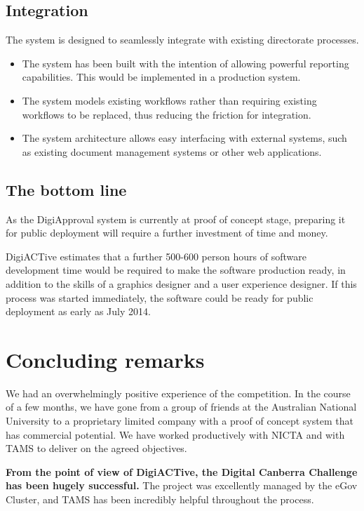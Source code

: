 \documentclass[12pt,a4paper,twosided]{article}
\begin{document}
\subsection{Integration}

The system is designed to seamlessly integrate with existing directorate
processes.

\begin{itemize}

\item
  The system has been built with the intention of allowing powerful
  reporting capabilities. This would be implemented in a production
  system.
\item
  The system models existing workflows rather than requiring existing
  workflows to be replaced, thus reducing the friction for integration.
\item
  The system architecture allows easy interfacing with external systems, such as existing document management systems or other web applications.
\end{itemize}

\subsection{The bottom line}

As the DigiApproval system is currently at proof of concept stage,
preparing it for public deployment will require a further investment of
time and money.

DigiACTive estimates that a further 500-600 person hours of software
development time would be required to make the software production
ready, in addition to the skills of a graphics designer and a user
experience designer. If this process was started immediately, the
software could be ready for public deployment as early as July 2014.


\newpage
\section{Concluding remarks}

We had an overwhelmingly positive experience of the competition. In the
course of a few months, we have gone from a group of friends at the
Australian National University to a proprietary limited company with a
proof of concept system that has commercial potential. We have worked
productively with NICTA and with TAMS to deliver on the agreed
objectives.

\textbf{From the point of view of DigiACTive, the Digital Canberra
Challenge has been hugely successful.} The project was excellently
managed by the eGov Cluster, and TAMS has been incredibly helpful
throughout the process.
\end{document}
